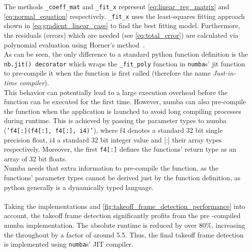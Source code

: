 The methods \texttt{\_coeff\_mat} and \texttt{\_fit\_x} represent
\autoref{eq:linear_reg_matrix} and \autoref{eq:normal_equation} respectively.
\texttt{\_fit\_x} uses the least-squares fitting approach shown in
\autoref{eq:gradient_linear_case} to find the best fitting model.
Furthermore, the residuals (errors) which are needed (see 
\autoref{eq:total_error}) are calculated via polynomial evaluation using
Horner's method~\cite{fuentesFastEvaluationPolynomials2022}.\\
As can be seen, the only difference to a standard python function definition
is the \texttt{nb.jit() decorator} which wraps the \texttt{\_fit\_poly}
function in \texttt{numba}s' jit function to pre-compile it when the function
is first called (therefore the name \textit{Just-in-time compiler}).\\
This behavior can potentially lead to a large execution overhead before the
function can be executed for the first time.
However, numba can also pre-compile the function when the application is
launched to avoid long compiling processes during runtime.
This is achieved by passing the parameter types to numba
(\texttt{'f4[:](f4[:], f4[:], i4)'}), where f4 denotes a standard 32 bit
single precision float, i4 a standard 32 bit integer value and [:] their array
types respectively.
Moreover, the first \texttt{f4[:]} defines the functions' return type
as an array of 32 bit floats.\\
Numba needs that extra information to pre-compile the function, as the
functions' parameter types cannot be derived just by the function definition,
as python generally is a dynamically typed language.\\\\
\noindent Taking the implementations and
\autoref{fig:takeoff_frame_detection_performance} into account, the takeoff
frame detection significantly profits from the pre -compiled numba
implementation.
The absolute runtime is reduced by over 80\%, increasing the throughout by a
factor of around 5.5.
Thus, the final takeoff frame detection is implemented using \texttt{numba}s'
JIT compiler.\\\\

